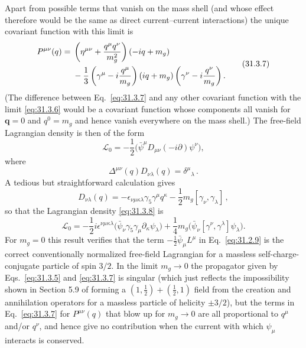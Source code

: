 Apart from possible terms that vanish on the mass shell (and whose effect
therefore would be the same as direct current--current interactions) the
unique covariant function with this limit is
\begin{equation}
  \begin{aligned}
  P^{\mu\nu}(q)={}&
  \left(\eta^{\mu\nu}+\frac{q^\mu q^\nu}{m_g^2}\right)
  (-i\sl{q}+m_g)
  \\
  &-\frac13
  \left(\gamma^\mu-i\frac{q^\mu}{m_g}\right)
  (i\sl{q}+m_g)
  \left(\gamma^\nu-i\frac{q^\nu}{m_g}\right).
  \end{aligned}
  \tag{31.3.7}\label{eq:31.3.7}
\end{equation}
(The difference between Eq.~\eqref{eq:31.3.7} and any other covariant
function with the limit \eqref{eq:31.3.6} would be a covariant function
whose components all vanish for \(\boldsymbol q=0\) and \(q^0=m_g\) and
hence vanish everywhere on the mass shell.) The free-field Lagrangian
density is then of the form
\begin{equation}
  \mathcal L_0
  =-\frac12\bigl(\bar\psi^\mu D_{\mu\nu}(-i\partial)\psi^\nu\bigr),
  \tag{31.3.8}\label{eq:31.3.8}
\end{equation}
where
\begin{equation}
  \Delta^{\mu\nu}(q)D_{\nu\lambda}(q)=\delta^\mu{}_\lambda\,.
  \tag{31.3.9}\label{eq:31.3.9}
\end{equation}
A tedious but straightforward calculation gives
\begin{equation}
  D_{\nu\lambda}(q)
  =-\epsilon_{\nu\mu\kappa\lambda}\gamma_5\gamma^\mu q^\kappa
   -\frac12m_g[\gamma_\nu,\gamma_\lambda]\,,
  \tag{31.3.10}\label{eq:31.3.10}
\end{equation}
so that the Lagrangian density \eqref{eq:31.3.8} is
\begin{equation}
  \mathcal L_0
  =-\frac12i\epsilon^{\nu\mu\kappa\lambda}
    \bigl(\bar\psi_\nu\gamma_5\gamma_\mu
    \partial_\kappa\psi_\lambda\bigr)
   +\frac14m_g
    \bigl(\bar\psi_\nu[\gamma^\nu,\gamma^\lambda]\psi_\lambda\bigr).
  \tag{31.3.11}\label{eq:31.3.11}
\end{equation}
For \(m_g=0\) this result verifies that the term
\(-\frac12\bar\psi_\mu L^\mu\) in Eq.~\eqref{eq:31.2.9} is the correct
conventionally normalized free-field Lagrangian for a massless
self-charge-conjugate particle of spin \(3/2\). In the limit \(m_g\to0\)
the propagator given by Eqs.~\eqref{eq:31.3.5} and \eqref{eq:31.3.7} is
singular (which just reflects the impossibility shown in Section 5.9 of
forming a \((1,\frac12)+(\frac12,1)\) field from the creation and
annihilation operators for a massless particle of helicity \(\pm3/2\)),
but the terms in Eq.~\eqref{eq:31.3.7} for \(P^{\mu\nu}(q)\) that blow up
for \(m_g\to0\) are all proportional to \(q^\mu\) and/or \(q^\nu\), and
hence give no contribution when the current with which \(\psi_\mu\)
interacts is conserved.

